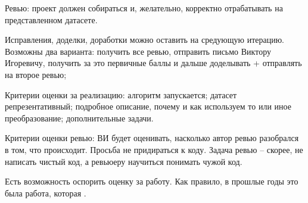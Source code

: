 \documentclass[main.tex]{subfiles}
\begin{document}
Ревью: проект должен собираться и, желательно, корректно отрабатывать на представленном датасете.

Исправления, доделки, доработки можно оставить на средующую итерацию.
Возможны два варианта: получить все ревью, отправить письмо Виктору Игоревичу, получить за это первичные баллы и дальше доделывать + отправлять на второе ревью;

Критерии оценки за реализацию: алгоритм запускается; датасет репрезентативный; подробное описание, почему и как используем то или иное преобразование; дополнительные задачи.

Критерии оценки ревью: ВИ будет оценивать, насколько автор ревью разобрался в том, что происходит.
Просьба не придираться к коду.
Задача ревью -- скорее, не написать чистый код, а ревьюеру научиться понимать чужой код.

Есть возможность оспорить оценку за работу.
Как правило, в прошлые годы это была работа, которая .
\end{document}
